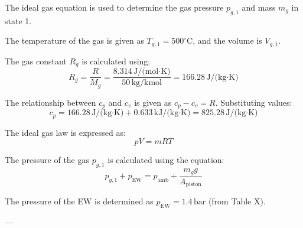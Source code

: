 The ideal gas equation is used to determine the gas pressure \( p_{g,1} \) and mass \( m_g \) in state 1.  

The temperature of the gas is given as \( T_{g,1} = 500^\circ\text{C} \), and the volume is \( V_{g,1} \).  

The gas constant \( R_g \) is calculated using:  
\[
R_g = \frac{R}{M_g} = \frac{8.314 \, \text{J/(mol·K)}}{50 \, \text{kg/kmol}} = 166.28 \, \text{J/(kg·K)}
\]  

The relationship between \( c_p \) and \( c_v \) is given as \( c_p - c_v = R \). Substituting values:  
\[
c_p = 166.28 \, \text{J/(kg·K)} + 0.633 \, \text{kJ/(kg·K)} = 825.28 \, \text{J/(kg·K)}
\]  

The ideal gas law is expressed as:  
\[
pV = mRT
\]  

The pressure of the gas \( p_{g,1} \) is calculated using the equation:  
\[
p_{g,1} + p_{\text{EW}} = p_{\text{amb}} + \frac{m_g g}{A_{\text{piston}}}
\]  

The pressure of the EW is determined as \( p_{\text{EW}} = 1.4 \, \text{bar} \) (from Table X).  

---